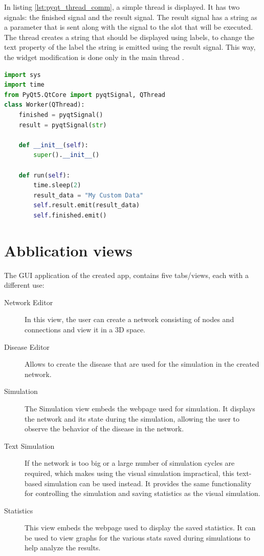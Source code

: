 In listing \ref{lst:pyqt_thread_comm}, a simple thread is displayed. It has two signals: the finished signal and the result signal. The result signal has a string as a parameter that is sent along with the signal to the slot that will be executed. The thread creates a string that should be displayed using labels, to change the text property of the label the string is emitted using the result signal. This way, the widget modification is done only in the main thread \cite{pyqt}.

\begin{lstlisting}[language=python, caption={Thread example}, label={lst:pyqt_thread_comm}]
import sys
import time
from PyQt5.QtCore import pyqtSignal, QThread
class Worker(QThread):
    finished = pyqtSignal()
    result = pyqtSignal(str)

    def __init__(self):
        super().__init__()

    def run(self):
        time.sleep(2)
        result_data = "My Custom Data"
        self.result.emit(result_data)
        self.finished.emit()
\end{lstlisting}


\section{Abblication views}
\label{sub:thread_views}
The GUI application of the created app, contains five tabs/views, each with a different use:
\begin{description}
    \item[Network Editor] In this view, the user can create a network consisting of nodes and connections and view it in a 3D space.
    \item[Disease Editor] Allows to create the disease that are used for the simulation in the created network.
    \item[Simulation] The Simulation view embeds the webpage used for simulation. It displays the network and its state during the simulation, allowing the user to observe the behavior of the disease in the network.
    \item[Text Simulation] If the network is too big or a large number of simulation cycles are required, which makes using the visual simulation impractical, this text-based simulation can be used instead. It provides the same functionality for controlling the simulation and saving statistics as the visual simulation.
    \item[Statistics] This view embeds the webpage used to display the saved statistics. It can be used to view graphs for the various stats saved during simulations to help analyze the results.
\end{description}

